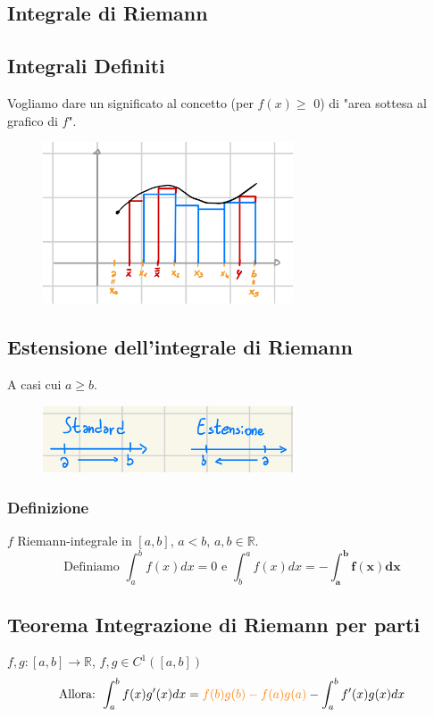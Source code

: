 \documentclass{article}
\newcommand{\R}{\mathbb{R}}
\begin{document}
\begin{flushleft}
\newpage
\section{Integrale di Riemann}
\subsection{Integrali Definiti}
Vogliamo dare un significato al concetto (per $f(x) \geq$ 0) di "area sottesa al grafico di $f$".

\begin{figure}[h]
    \centering
    \includegraphics[width=20em]{./images/riemann.png}
\end{figure}
\FloatBarrier

\subsection{Estensione dell'integrale di Riemann}
A casi cui $a \geq b$.

\begin{figure}[h]
    \centering
    \includegraphics[width=20em]{./images/riemann_extension.jpeg}
\end{figure}
\FloatBarrier

\subsubsection{Definizione}
$f$ Riemann-integrale in $[a,b]$, $a < b$, $a, b \in \R$.\\
\[
    \text{Definiamo }\int_{a}^{b}f(x)dx = 0\text{ e }\int_{b}^{a}f(x)dx = \mathbf{ - \int_{a}^{b}f(x)dx}
\]

\subsection{Teorema Integrazione di Riemann per parti}
$f, g: [a,b] \rightarrow \R $, $f, g \in C^1([a,b])$\\
\[
    \text{Allora: } \int_{a}^{b}f(x)g'(x)dx =\textcolor{orange}{ f(b)g(b) - f(a)g(a)} - \int_{a}^{b}f'(x)g(x)dx
\]


\end{flushleft}
\end{document}

